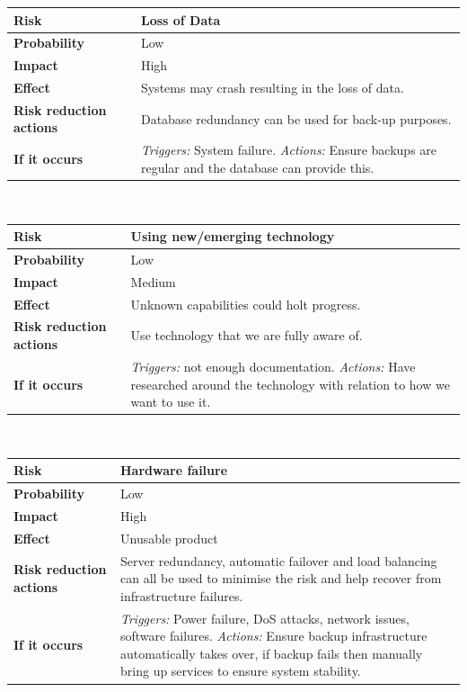 \noindent
\begin{tabular}{|l || p{10.3cm}|}
\hline
\textbf{Risk} & Loss of Data \\ \hline
\textbf{Probability} & Low \\ \hline
\textbf{Impact} & High \\ \hline
\textbf{Effect} & Systems may crash resulting in the loss of data.\\ \hline
\textbf{Risk reduction actions} & Database redundancy can be used for back-up purposes. \\ \hline
\textbf{If it occurs} &  \emph{Triggers:} System failure.  \emph{Actions:} Ensure backups are regular and the database can provide this.\\ 
\hline
\end{tabular}\\
\vspace{0.5cm}

\noindent
\begin{tabular}{|l || p{10.3cm}|}
\hline
\textbf{Risk} & Using new/emerging technology \\ \hline
\textbf{Probability} & Low \\ \hline
\textbf{Impact} & Medium \\ \hline
\textbf{Effect} & Unknown capabilities could holt progress.\\ \hline
\textbf{Risk reduction actions} & Use technology that we are fully aware of. \\ \hline
\textbf{If it occurs} &  \emph{Triggers:} not enough documentation.  \emph{Actions:} Have researched around the technology with relation to how we want to use it.\\ 
\hline
\end{tabular}\\
\vspace{0.5cm}

\noindent
\begin{tabular}{|l || p{10.3cm}|}
\hline
\textbf{Risk} & Hardware failure\\ \hline
\textbf{Probability} & Low \\ \hline
\textbf{Impact} & High \\ \hline
\textbf{Effect} & Unusable product\\ \hline
\textbf{Risk reduction actions} & Server redundancy, automatic failover and load balancing can all be used to minimise the risk and help recover from infrastructure failures. \\ \hline
\textbf{If it occurs} &  \emph{Triggers:} Power failure, DoS attacks, network issues, software failures.  \emph{Actions:} Ensure backup infrastructure automatically takes over, if backup fails then manually bring up services to ensure system stability.\\ 
\hline
\end{tabular}\\
\vspace{0.5cm}
